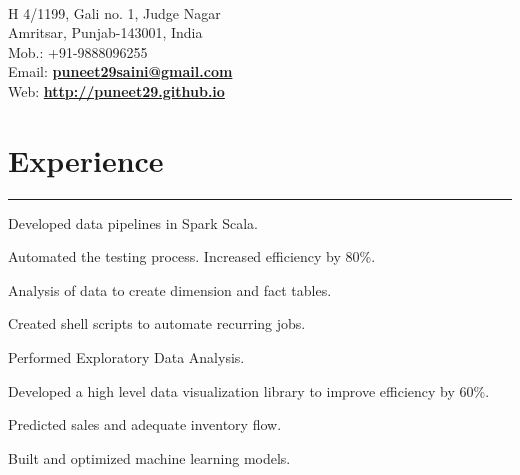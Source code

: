 \documentclass[]{puneet-resume}
\begin{document}
\hfill
\begin{minipage}[t]{0.66\textwidth}
\hspace*{1pt}\hfill    \\
\hspace*{0pt}\hfill H 4/1199, Gali no. 1, Judge Nagar \\
\hspace*{0pt}\hfill Amritsar, Punjab-143001, India \\
\hspace*{0pt}\hfill Mob.: +91-9888096255 \\
\hspace*{0pt}\hfill Email: \textbf{\href{mailto:puneet29saini@gmail.com}{puneet29saini@gmail.com}} \\
\hspace*{0pt}\hfill Web: \textbf{\href{http://puneet29.github.io}{http://puneet29.github.io}} 
\section{Experience}
\noindent\rule{12.5cm}{0.4pt}
 
\noindent
\hspace{2.8em}%
\begin{minipage}{0.85\textwidth\vspace{2pt}}
\begin{tightemize}
	\item Developed data pipelines in Spark Scala.
	\item Automated the testing process. Increased efficiency by 80\%.
	\item Analysis of data to create dimension and fact tables.
	\item Created shell scripts to automate recurring jobs.
\end{tightemize}
\end{minipage}
\sectionsep

 
\noindent
\hspace{2.8em}%
\begin{minipage}{0.85\textwidth\vspace{2pt}}
\begin{tightemize}
	\item[] 
	\item Performed Exploratory Data Analysis.
	\item Developed a high level data visualization library to improve efficiency by 60\%.
	\item Predicted sales and adequate inventory flow.
	\item Built and optimized machine learning models.
\end{tightemize}
\end{minipage}
\sectionsep


\end{minipage}
\end{document}
